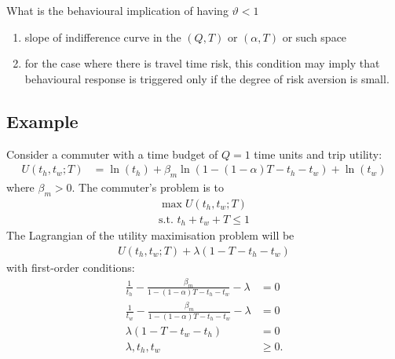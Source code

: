 \documentclass[12pt,a4paper,british]{article}
\begin{document}
{\color{red} {What is the behavioural implication of having $\vartheta<1$}
\begin{enumerate}
    \item slope of indifference curve in the $(Q, T)$ or $(\alpha, T)$ or such space
    \item for the case where there is travel time risk, this condition may imply that behavioural response is triggered only if the degree of risk aversion is small.
\end{enumerate}
    
}

\subsection*{Example}

Consider a commuter with a time budget of $Q=1$ time units and trip utility:
\begin{align*}
U\left(t_{h},t_{w};T\right) & =\ln\left(t_{h}\right)+\beta_{m}\ln\left(1-\left(1-\alpha\right)T-t_{h}-t_{w}\right)+\ln\left(t_{w}\right)
\end{align*}
where $\beta_{m}>0$. The commuter's problem is to 
\begin{gather*}
\max U\left(t_{h},t_{w};T\right)\\
\mbox{s.t. }t_{h}+t_{w}+T\leq1
\end{gather*}
The Lagrangian of the utility maximisation problem will be
\begin{gather*}
U\left(t_{h},t_{w};T\right)+\lambda\left(1-T-t_{h}-t_{w}\right)
\end{gather*}
with first-order conditions:
\begin{align*}
\frac{1}{t_{h}}-\frac{\beta_{m}}{1-\left(1-\alpha\right)T-t_{h}-t_{w}}-\lambda & =0\\
\frac{1}{t_{w}}-\frac{\beta_{m}}{1-\left(1-\alpha\right)T-t_{h}-t_{w}}-\lambda & =0\\
\lambda\left(1-T-t_{w}-t_{h}\right) & =0\\
\lambda,t_{h},t_{w} & \geq0.
\end{align*}
\end{document}
